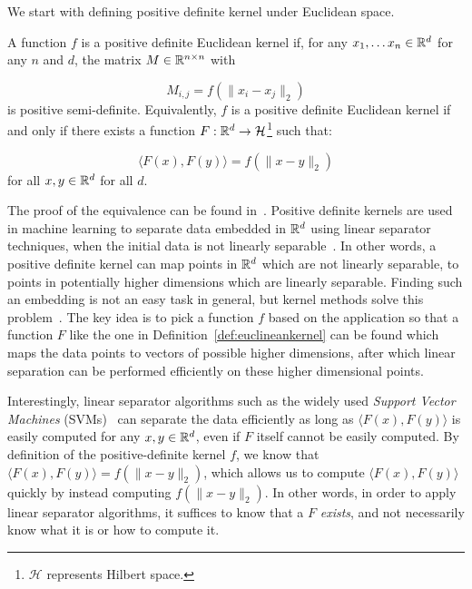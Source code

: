 We start with defining positive definite kernel under Euclidean space.
 \begin{definition} \label{def:euclineankernel}A function $f$ is a positive definite Euclidean kernel
 if, for any $x_1, \ldots x_n \in {\mathbb R}^d$ for any $n$ and $d$, the matrix $M \in {\mathbb R}^{n \times n}$ with
 
 \[ M_{i,j} = f(\|x_i - x_j\|_2) \]
 is positive semi-definite. Equivalently, $f$ is a positive definite Euclidean kernel if and only if there exists a function $F:{\mathbb R}^d \to \mathcal{H}$\footnote{$\mathcal{H}$ represents Hilbert space.} such that:
 
 \[\langle F(x), F(y) \rangle = f(\|x-y\|_2)\]
 for all $x, y \in {\mathbb R}^d$ for all $d$.
 \end{definition}
 The proof of the equivalence can be found in~\cite{s42}. Positive definite kernels are used in machine learning to separate data embedded in ${\mathbb R}^d$ using linear separator techniques, when the initial data is not linearly separable~\cite{s96, sow01, ss01}. In other words, a positive definite kernel can map points in ${\mathbb R}^d$ which are not linearly separable, to points in potentially higher dimensions which are linearly separable. Finding such an embedding is not an easy task in general, but kernel methods solve this problem~\cite{s96, sow01, ss01}. The key idea is to pick a function $f$ based on the application so that a function $F$ like the one in Definition~\ref{def:euclineankernel} can be found which maps the data points to vectors of possible higher dimensions, after which linear separation can be performed efficiently on these higher dimensional points.
 
Interestingly, linear separator algorithms such as the widely used \emph{Support Vector Machines} (SVMs)~\cite{cv95} can separate the data efficiently as long as $\langle F(x), F(y) \rangle$ is easily computed for any $x, y \in {\mathbb R}^d$, even if $F$ itself cannot be easily computed. By definition of the positive-definite kernel $f$, we know that $\langle F(x), F(y) \rangle = f(\|x - y\|_2)$, which allows us to compute $\langle F(x), F(y) \rangle$ quickly by instead computing $f(\|x - y\|_2)$. In other words, in order to apply linear separator algorithms, it suffices to know that a $F$ \emph{exists}, and not necessarily know what it is or how to compute it.

